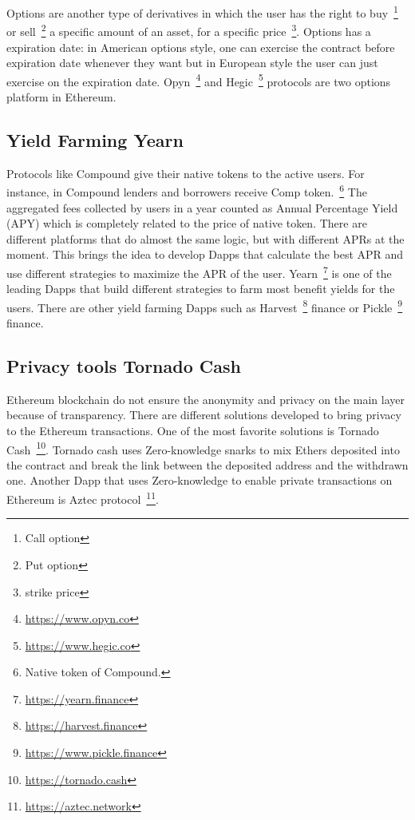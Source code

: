 Options are another type of derivatives in which the user has the right to buy~\footnote{Call option} or sell~\footnote{Put option} a specific amount of an asset, for a specific price~\footnote{strike price}. Options has a expiration date: in American options style, one can exercise the contract before expiration date whenever they want but in European style the user can just exercise on the expiration date. Opyn~\footnote{\url{https://www.opyn.co}} and Hegic~\footnote{\url{https://www.hegic.co}} protocols are two options platform in Ethereum.


\subsection{Yield Farming \eg Yearn}
Protocols like Compound give their native tokens to the active users. For instance, in Compound lenders and borrowers receive Comp token.~\footnote{Native token of Compound.} The aggregated fees collected by users in a year counted as Annual Percentage Yield (APY) which is completely related to the price of native token. There are different platforms that do almost the same logic, but with different APRs at the moment. This brings the idea to develop Dapps that calculate the best APR and use different strategies to maximize the APR of the user. Yearn~\footnote{\url{https://yearn.finance}} is one of the leading Dapps that build different strategies to farm most benefit yields for the users. There are other yield farming Dapps such as Harvest~\footnote{\url{https://harvest.finance}} finance or Pickle~\footnote{\url{https://www.pickle.finance}} finance.

\subsection{Privacy tools \eg Tornado Cash}
Ethereum blockchain do not ensure the anonymity and privacy on the main layer because of transparency. There are different solutions developed to bring privacy to the Ethereum transactions. One of the most favorite solutions is Tornado Cash~\footnote{\url{https://tornado.cash}}. Tornado cash uses Zero-knowledge snarks to mix Ethers deposited into the contract and break the link between the deposited address and the withdrawn one. Another Dapp that uses Zero-knowledge to enable private transactions on Ethereum is Aztec protocol~\footnote{\url{https://aztec.network}}.




